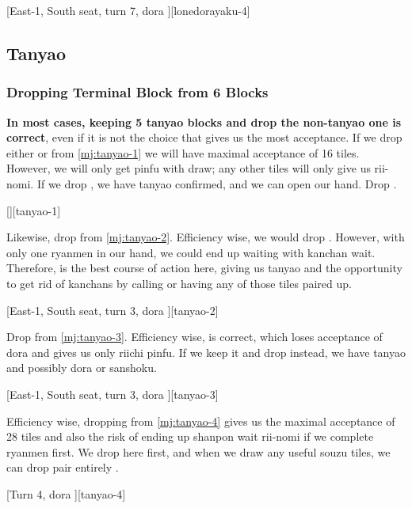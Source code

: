 \documentclass[12pt]{article}
\begin{document}
[East-1, South seat, turn 7, dora ][lonedorayaku-4]


\subsection{Tanyao}

\subsubsection*{Dropping Terminal Block from 6 Blocks}

\textbf{In most cases, keeping 5 tanyao blocks and drop the non-tanyao one is correct}, even if it is not the choice that gives us the most acceptance. If we drop either  or  from \ref{mj:tanyao-1} we will have maximal acceptance of 16 tiles. However, we will only get pinfu with  draw; any other tiles will only give us rii-nomi. If we drop , we have tanyao confirmed, and we can open our hand. Drop .

[][tanyao-1]

Likewise, drop  from \ref{mj:tanyao-2}. Efficiency wise, we would drop . However, with only one ryanmen in our hand, we could end up waiting with kanchan wait. Therefore,  is the best course of action here, giving us tanyao and the opportunity to get rid of kanchans by calling or having any of those tiles paired up.

[East-1, South seat, turn 3, dora ][tanyao-2]

Drop  from \ref{mj:tanyao-3}. Efficiency wise,  is correct, which loses acceptance of  dora and gives us only riichi pinfu. If we keep it and drop  instead, we have tanyao and possibly dora or sanshoku.

[East-1, South seat, turn 3, dora ][tanyao-3]

Efficiency wise, dropping  from \ref{mj:tanyao-4} gives us the maximal acceptance of 28 tiles and also the risk of ending up shanpon wait rii-nomi if we complete ryanmen first. We drop  here first, and when we draw any useful souzu tiles, we can drop  pair entirely \citep[][pp.~68--69]{fkt}.

[Turn 4, dora ][tanyao-4]
\end{document}
